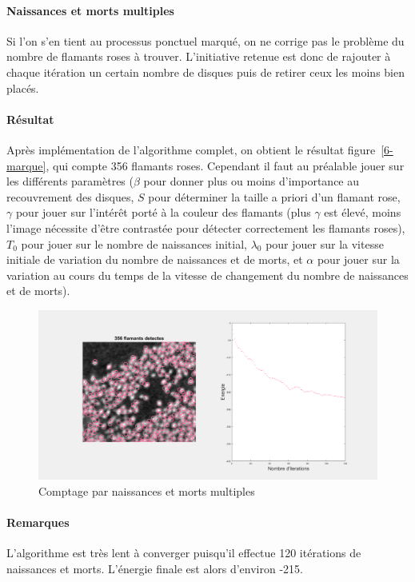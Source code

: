 \documentclass{article}
\begin{document}
\paragraph{Naissances et morts multiples}
Si l'on s'en tient au processus ponctuel marqué, on ne corrige pas le problème du nombre de flamants roses à trouver. L'initiative retenue est donc de rajouter à chaque itération un certain nombre de disques puis de retirer ceux les moins bien placés.

\paragraph{Résultat}
Après implémentation de l'algorithme complet, on obtient le résultat figure~\ref{6-marque}, qui compte 356 flamants roses. Cependant il faut au préalable jouer sur les différents paramètres ($\beta$ pour donner plus ou moins d'importance au recouvrement des disques, $S$ pour déterminer la taille a priori d'un flamant rose, $\gamma$ pour jouer sur l'intérêt porté à la couleur des flamants (plus $\gamma$ est élevé, moins l'image nécessite d'être contrastée pour détecter correctement les flamants roses), $T_0$ pour jouer sur le nombre de naissances initial, $\lambda_0$ pour jouer sur la vitesse initiale de variation du nombre de naissances et de morts, et $\alpha$ pour jouer sur la variation au cours du temps de la vitesse de changement du nombre de naissances et de morts).
\begin{figure}[!ht]
    \centering
    \includegraphics[width=\linewidth]{images/6-best.png}
    \caption{Comptage par naissances et morts multiples}
    \label{6-naif}
\end{figure}

\paragraph{Remarques}
L'algorithme est très lent à converger puisqu'il effectue 120 itérations de naissances et morts. L'énergie finale est alors d'environ -215.
\end{document}
